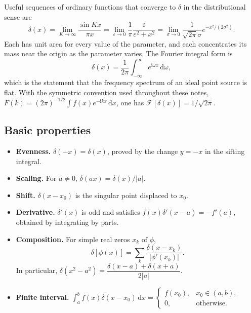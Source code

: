 Useful sequences of ordinary functions that converge to $\delta$ in the distributional sense are
\begin{equation}
\delta(x)=\lim_{K\to\infty}\frac{\sin Kx}{\pi x}
=\lim_{\varepsilon\to0}\frac{1}{\pi}\frac{\varepsilon}{\varepsilon^2+x^2}
=\lim_{\sigma\to0}\frac{1}{\sqrt{2\pi}\sigma}e^{-x^2/(2\sigma^2)}.
\end{equation}
Each has unit area for every value of the parameter, and each concentrates its mass near the origin as the parameter varies. The Fourier integral form is
\begin{equation}
\delta(x)=\frac{1}{2\pi}\int_{-\infty}^{\infty}e^{\mathrm{i}\omega x}\,\mathrm{d}\omega,
\end{equation}
which is the statement that the frequency spectrum of an ideal point source is flat. With the symmetric convention used throughout these notes,
$F(k)=(2\pi)^{-1/2}\int f(x)e^{-\mathrm{i}kx}\,\mathrm{d}x$, one has $\mathcal{F}[\delta(x)]=1/\sqrt{2\pi}$.

\subsection{Basic properties}

\begin{itemize}
  \item \textbf{Evenness.} $\delta(-x)=\delta(x)$, proved by the change $y=-x$ in the sifting integral.
  \item \textbf{Scaling.} For $a\neq 0$, $\delta(ax)=\delta(x)/|a|$.
  \item \textbf{Shift.} $\delta(x-x_0)$ is the singular point displaced to $x_0$.
  \item \textbf{Derivative.} $\delta'(x)$ is odd and satisfies $f(x)\delta'(x-a)=-f'(a)$, obtained by integrating by parts.
  \item \textbf{Composition.} For simple real zeros $x_k$ of $\phi$,
  \begin{equation}
  \delta[\phi(x)]=\sum_k\frac{\delta(x-x_k)}{|\phi'(x_k)|}.
  \end{equation}
  In particular, $\delta(x^2-a^2)=\dfrac{\delta(x-a)+\delta(x+a)}{2|a|}$.
  \item \textbf{Finite interval.} $\displaystyle\int_a^b f(x)\delta(x-x_0)\,\mathrm{d}x=
  \begin{cases}f(x_0),&x_0\in(a,b),\\ 0,&\text{otherwise.}\end{cases}$
\end{itemize}

